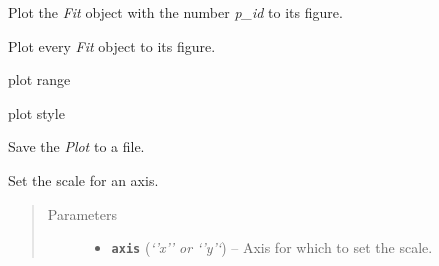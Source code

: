 \documentclass[a4paper,10pt,english]{sphinxmanual}
\begin{document}
\begin{fulllineitems}

\begin{fulllineitems}
\label{index:kafe.plot.Plot.plot}
Plot the \emph{Fit} object with the number \emph{p\_id} to its figure.

\end{fulllineitems}


\begin{fulllineitems}
\label{index:kafe.plot.Plot.plot_all}
Plot every \emph{Fit} object to its figure.

\end{fulllineitems}


\begin{fulllineitems}
\label{index:kafe.plot.Plot.plot_range}
plot range

\end{fulllineitems}


\begin{fulllineitems}
\label{index:kafe.plot.Plot.plot_style}
plot style

\end{fulllineitems}


\begin{fulllineitems}
\label{index:kafe.plot.Plot.save}
Save the \emph{Plot} to a file.

\end{fulllineitems}


\begin{fulllineitems}
\label{index:kafe.plot.Plot.set_axis_scale}
Set the scale for an axis.
\begin{quote}\begin{description}
\item[{Parameters}] \leavevmode\begin{itemize}
\item {} 
\textbf{\texttt{axis}} (\emph{`'x'' or `'y'`}) -- Axis for which to set the scale.


\end{itemize}
\end{description}
\end{quote}
\end{fulllineitems}
\end{fulllineitems}
\end{document}
